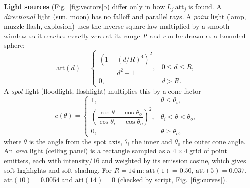 \documentclass[12pt,a4paper,oneside]{report}
\begin{document}
\textbf{Light sources} (Fig.~\ref{fig:vectors}b) differ only in how $L_j\,\mathrm{att}_j$ is found. A \emph{directional} light (sun, moon) has no falloff and parallel rays. A \emph{point} light (lamp, muzzle flash, explosion) uses the inverse-square law multiplied by a smooth window so it reaches exactly zero at its range $R$ and can be drawn as a bounded sphere:
\begin{equation}\mathrm{att}(d)=\begin{cases}\dfrac{\left(1-(d/R)^{4}\right)^{2}}{d^{2}+1}, & 0\le d\le R,\\[8pt] 0, & d>R.\end{cases}\end{equation}
A \emph{spot} light (floodlight, flashlight) multiplies this by a cone factor \begin{equation}c(\theta)=\begin{cases}1, & \theta\le\theta_i,\\[2pt]\left(\dfrac{\cos\theta-\cos\theta_o}{\cos\theta_i-\cos\theta_o}\right)^{2}, & \theta_i<\theta<\theta_o,\\[8pt]0, & \theta\ge\theta_o,\end{cases}\end{equation}
where $\theta$ is the angle from the spot axis, $\theta_i$ the inner and $\theta_o$ the outer cone angle. An \emph{area} light (ceiling panel) is a rectangle sampled as a $4\times4$ grid of point emitters, each with intensity$/16$ and weighted by its emission cosine, which gives soft highlights and soft shading. For $R=14$\,m: $\mathrm{att}(1)=0.50$, $\mathrm{att}(5)=0.037$, $\mathrm{att}(10)=0.0054$ and $\mathrm{att}(14)=0$ (checked by script, Fig.~\ref{fig:curves}).
\end{document}
